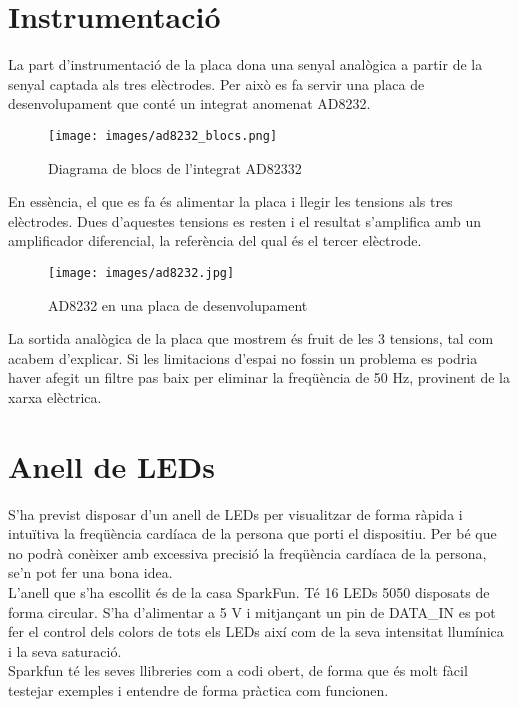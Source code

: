 \section{Instrumentació}
La part d'instrumentació de la placa dona una senyal analògica a partir de la senyal captada als tres elèctrodes. Per això es fa servir una placa de desenvolupament que conté un integrat anomenat AD8232.

\begin{figure}[H]
\begin{center}
\texttt{[image: images/ad8232\_blocs.png]}
\end{center}
\caption{Diagrama de blocs de l'integrat AD82332}
\label{fig:ad8232}
\end{figure}
%
%
\noindent En essència, el que es fa és alimentar la placa i llegir les tensions als tres elèctrodes. Dues d'aquestes tensions es resten i el resultat s'amplifica amb un amplificador diferencial, la referència del qual és el tercer elèctrode.

\begin{figure}[H]
\begin{center}
\texttt{[image: images/ad8232.jpg]}
\end{center}
\caption{AD8232 en una placa de desenvolupament}
\label{fig:ad8232}
\end{figure}
%
\noindent La sortida analògica de la placa que mostrem és fruit de les 3 tensions, tal com acabem d'explicar. Si les limitacions d'espai no fossin un problema es podria haver afegit un filtre pas baix per eliminar la freqüència de 50 Hz, provinent de la xarxa elèctrica.

\section{Anell de LEDs}
S'ha previst disposar d'un anell de LEDs per visualitzar de forma ràpida i intuïtiva la freqüència cardíaca de la persona que porti el dispositiu. Per bé que no podrà conèixer amb excessiva precisió la freqüència cardíaca de la persona, se'n pot fer una bona idea.\\
\newline L'anell que s'ha escollit és de la casa SparkFun. Té 16 LEDs 5050 disposats de forma circular. S'ha d'alimentar a 5 V i mitjançant un pin de DATA\_IN es pot fer el control dels colors de tots els LEDs així com de la seva intensitat llumínica i la seva saturació.\\
\newline Sparkfun té les seves llibreries com a codi obert, de forma que és molt fàcil testejar exemples i entendre de forma pràctica com funcionen.

